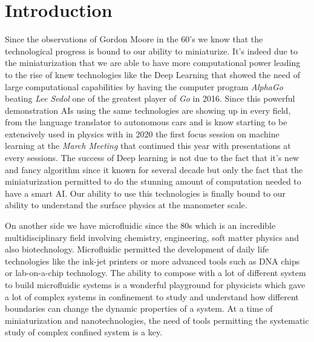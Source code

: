 \section{Introduction}
  \label{sec:Intro}

Since the observations of Gordon Moore in the 60's we know that the technological progress is bound to our ability to miniaturize. It's indeed due to the miniaturization that we are able to have more computational power leading to the rise of knew technologies like the Deep Learning that showed the need of large computational capabilities by having the computer program \textit{AlphaGo} beating \textit{Lee Sedol} one of the greatest player of \textit{Go} in 2016. Since this powerful demonstration AIs using the same technologies are showing up in every field, from the language translator to autonomous cars and is know starting to be extensively used in physics with in 2020 the first focus session on machine learning at the \textit{March Meeting} that continued this year with presentations at every sessions.
The success of Deep learning is not due to the fact that it's new and fancy algorithm since it known for several decade but only the fact that the miniaturization permitted to do the stunning amount of computation needed to have a smart AI. Our ability to use this technologies is finally bound to our ability to understand the surface physics at the manometer scale.

On another side we have microfluidic since the 80s which is an incredible multidisciplinary field involving chemistry, engineering, soft matter physics and also biotechnology. Microfluidic permitted the development of daily life technologies like the ink-jet printers or more advanced tools such as DNA chips or lab-on-a-chip technology. The ability to compose with a lot of different system to build microfluidic systems is a wonderful playground for physicists which gave a lot of complex systems in confinement to study and understand how different boundaries can change the dynamic properties of a system. At a time of miniaturization and nanotechnologies, the need of tools permitting the systematic study of complex confined system is a key. 

